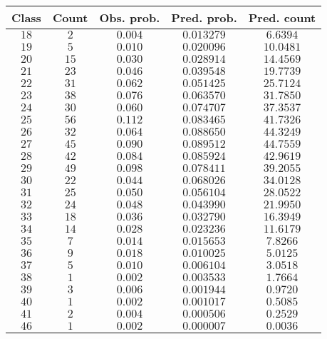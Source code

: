 \begin{tabular}{ccccc} \toprule
Class & Count & Obs. prob. & Pred. prob. & Pred. count \\\midrule
$18$  & $2$   & $0.004$    & $0.013279$  & $6.6394$  \\
$19$  & $5$   & $0.010$    & $0.020096$  & $10.0481$ \\
$20$  & $15$  & $0.030$    & $0.028914$  & $14.4569$ \\
$21$  & $23$  & $0.046$    & $0.039548$  & $19.7739$ \\
$22$  & $31$  & $0.062$    & $0.051425$  & $25.7124$ \\
$23$  & $38$  & $0.076$    & $0.063570$  & $31.7850$ \\
$24$  & $30$  & $0.060$    & $0.074707$  & $37.3537$ \\
$25$  & $56$  & $0.112$    & $0.083465$  & $41.7326$ \\
$26$  & $32$  & $0.064$    & $0.088650$  & $44.3249$ \\
$27$  & $45$  & $0.090$    & $0.089512$  & $44.7559$ \\
$28$  & $42$  & $0.084$    & $0.085924$  & $42.9619$ \\
$29$  & $49$  & $0.098$    & $0.078411$  & $39.2055$ \\
$30$  & $22$  & $0.044$    & $0.068026$  & $34.0128$ \\
$31$  & $25$  & $0.050$    & $0.056104$  & $28.0522$ \\
$32$  & $24$  & $0.048$    & $0.043990$  & $21.9950$ \\
$33$  & $18$  & $0.036$    & $0.032790$  & $16.3949$ \\
$34$  & $14$  & $0.028$    & $0.023236$  & $11.6179$ \\
$35$  & $7$   & $0.014$    & $0.015653$  & $7.8266$  \\
$36$  & $9$   & $0.018$    & $0.010025$  & $5.0125$  \\
$37$  & $5$   & $0.010$    & $0.006104$  & $3.0518$  \\
$38$  & $1$   & $0.002$    & $0.003533$  & $1.7664$  \\
$39$  & $3$   & $0.006$    & $0.001944$  & $0.9720$  \\
$40$  & $1$   & $0.002$    & $0.001017$  & $0.5085$  \\
$41$  & $2$   & $0.004$    & $0.000506$  & $0.2529$  \\
$46$  & $1$   & $0.002$    & $0.000007$  & $0.0036$  \\\bottomrule
\end{tabular}
